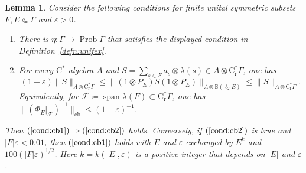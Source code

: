 \documentclass[12pt,nosumlimits,nonamelimits]{amsart}
\newtheorem{lem}[thm]{Lemma}
\theoremstyle{remark}
\theoremstyle{definition}
\newcommand{\IB}{\mathbb{B}}
\newcommand{\rC}{\mathrm{C}}
\newcommand{\rr}{\mathrm{r}}
\newcommand{\cF}{\mathcal{F}}
\newcommand{\ve}{\varepsilon}
\newcommand{\Ga}{\Gamma}
\DeclareMathOperator{\cb}{cb}
\DeclareMathOperator{\Prob}{Prob}
\newcommand{\lspan}{\mathop{\mathrm{span}}}
\newcommand{\cst}{$\rC^*$-alge\-bra}
\begin{document}
\begin{lem}\label{lem:osex}
Consider the following conditions 
for finite unital symmetric subsets $F,E\Subset\Ga$ 
and $\ve>0$. 
\begin{enumerate}
\item\label{cond:cb1}
There is $\eta\colon\Ga\to\Prob \Ga$ that satisfies 
the displayed condition in Definition~\ref{defn:unifex}.
\item\label{cond:cb2}
For every \cst{} $A$ and 
$S=\sum_{s\in F} a_s\otimes \lambda(s) \in A\otimes\rC^*_\rr\Ga$, 
one has 
\[
(1-\ve)\|S\|_{A\otimes\rC^*_\rr\Ga} 
 \le \|(1\otimes P_E)S(1\otimes P_E)\|_{A\otimes\IB(\ell_2E)}
 \le \|S\|_{A\otimes\rC^*_\rr\Ga}.
\]
Equivalently, for $\cF\coloneq\lspan\lambda(F)\subset\rC^*_\rr\Ga$, 
one has $\|(\Phi_E|_\cF)^{-1}\|_{\cb}\le (1-\ve)^{-1}$. 
\end{enumerate}
Then $(\ref{cond:cb1})\Rightarrow(\ref{cond:cb2})$ holds. 
Conversely, if $(\ref{cond:cb2})$ is true and $|F|\ve<0.01$, 
then $(\ref{cond:cb1})$ holds with $E$ and $\ve$ 
exchanged by $E^k$ and $100(|F|\ve)^{1/2}$. 
Here $k = k(|E|,\ve)$ is a positive integer that depends 
on $|E|$ and $\ve$.
\end{lem}
\end{document}
